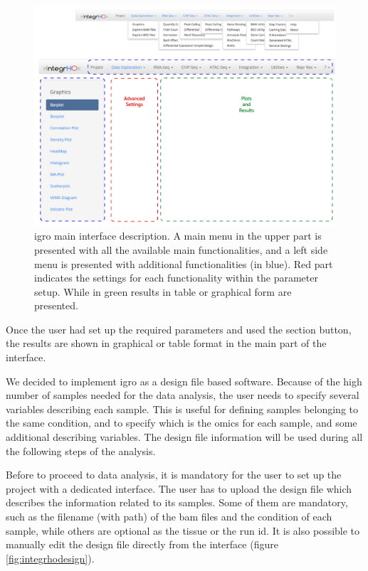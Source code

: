 \begin{figure}[H]
\centering
\includegraphics[width=\textwidth, keepaspectratio]{img/integrho/interface.png}
\caption[\gls{igro} main interface]{\gls{igro} main interface description. A main menu in the upper part is presented with all the available main functionalities, and a left side menu is presented with additional functionalities (in blue). Red part indicates the settings for each functionality within the parameter setup. While in green results in table or graphical form are presented.}
\label{fig:integrhomain}
\end{figure}

Once the user had set up the required parameters and used the section button, the results are shown in graphical or table format in the main part of the interface.

We decided to implement \gls{igro} as a design file based software.
Because of the high number of samples needed for the data analysis, the user needs to specify several variables describing each sample.
This is useful for defining samples belonging to the same condition, and to specify which is the omics for each sample, and some additional describing variables.
The design file information will be used during all the following steps of the analysis.

Before to proceed to data analysis, it is mandatory for the user to set up the project with a dedicated interface.
The user has to upload the design file which describes the information related to its samples.
Some of them are mandatory, such as the filename (with path) of the \gls{bam} files and the condition of each sample, while others are optional as the tissue or the run id. 
It is also possible to manually edit the design file directly from the interface (figure \ref{fig:integrhodesign}).

